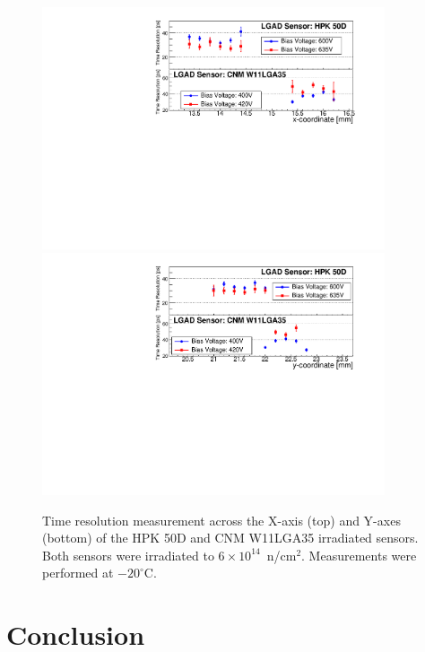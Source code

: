 \documentclass[preprint,1p]{elsarticle}
\begin{document}
\begin{figure}[htbp] 
\centering
\includegraphics[width=0.90\textwidth]{figs/USCSBoard_HPK50DIrradiated-CNMW11LGA35_Run936-961/IrradiatedSensorStudy_TimeResolution_vs_X.pdf} 
\includegraphics[width=0.90\textwidth]{figs/USCSBoard_HPK50DIrradiated-CNMW11LGA35_Run936-961/IrradiatedSensorStudy_TimeResolution_vs_Y.pdf} 
\caption{Time resolution measurement across the X-axis (top) and Y-axes (bottom) of the HPK 50D and CNM W11LGA35 irradiated sensors. Both sensors were irradiated to $6\times 10^{14}$~n/cm$^2$. Measurements were performed at $-20^{\circ}$C.} 
\label{fig:IrradiatedSensorStudy_TimeResolution} 
\end{figure} 

 

\section{Conclusion}
\label{sec:conclusion} 
\end{document}
